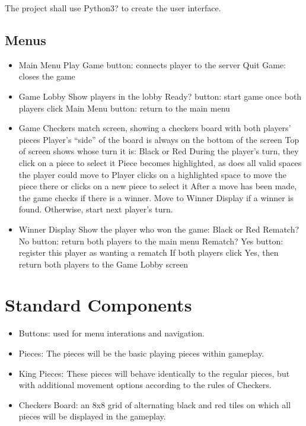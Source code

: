 \documentclass[10pt]{article}
\begin{document}
The project shall use Python3? to create the user interface.

\subsection{Menus}

\begin{itemize}
\item Main Menu
    \subitem Play Game button: connects player to the server
    \subitem Quit Game: closes the game

\item Game Lobby
    \subitem Show players in the lobby
    \subitem Ready? button: start game once both players click
    \subitem Main Menu button: return to the main menu

\item Game
    \subitem Checkers match screen, showing a checkers board with both players’ pieces
        \subsubitem Player’s “side” of the board is always on the bottom of the screen
    \subitem Top of screen shows whose turn it is: Black or Red
        \subsubitem During the player’s turn, they click on a piece to select it
        \subsubitem Piece becomes highlighted, as does all valid spaces the player could move to
        \subsubitem Player clicks on a highlighted space to move the piece there or clicks on a new piece to select it
        \subsubitem After a move has been made, the game checks if there is a winner. Move to Winner Display if a winner is found. Otherwise, start next player’s turn.

\item Winner Display
    \subitem Show the player who won the game: Black or Red
    \subitem Rematch? No button: return both players to the main menu
    \subitem Rematch? Yes button: register this player as wanting a rematch
        \subsubitem If both players click Yes, then return both players to the Game Lobby screen
\end{itemize}

\section{Standard Components}

\begin{itemize}
    \item Buttons: used for menu interations and navigation.
    \item Pieces: The pieces will be the basic playing pieces within gameplay.
    \item King Pieces: These pieces will behave identically to the regular pieces, but with additional movement options according to the rules of Checkers.
    \item Checkers Board: an 8x8 grid of alternating black and red tiles on which all pieces will be displayed in the gameplay.
\end{itemize}
\end{document}
